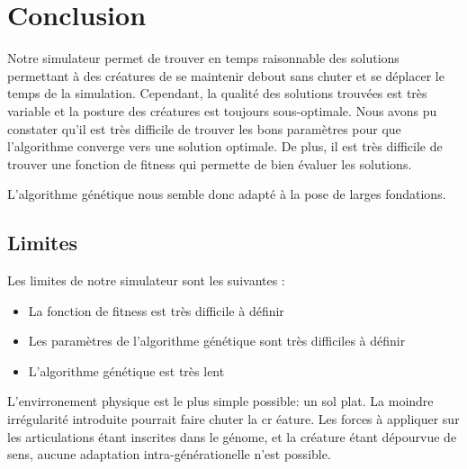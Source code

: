 \documentclass[journal, a4paper]{IEEEtran}
\begin{document}

\section{Conclusion}\label{sec:conclusion}
	Notre simulateur permet de trouver en temps raisonnable des
	solutions permettant à des créatures de se maintenir debout sans
	chuter et	se déplacer le temps de la simulation.
	Cependant, la qualité des solutions trouvées est très variable et
	la posture des créatures est toujours sous-optimale.
	Nous avons pu constater qu'il est très difficile
	de trouver les bons paramètres pour que l'algorithme converge
	vers une solution optimale. De plus, il est très difficile
	de trouver une fonction de fitness qui permette de bien
	évaluer les solutions.

	L'algorithme génétique nous semble donc adapté à la pose de
	larges fondations.

\subsection{Limites}\label{subsec:limites}
	Les limites de notre simulateur sont les suivantes :
	\begin{itemize}
		\item La fonction de fitness est très difficile à définir
		\item Les paramètres de l'algorithme génétique sont très difficiles
		à définir
		\item L'algorithme génétique est très lent
	\end{itemize}
	L'envirronement physique est le plus simple possible: un sol plat.
	La moindre irrégularité introduite pourrait faire chuter la cr
	éature.
	Les forces à appliquer sur les articulations étant inscrites dans
	le génome, et la créature étant dépourvue de sens, aucune adaptation
	intra-générationelle n'est possible.
\end{document}
